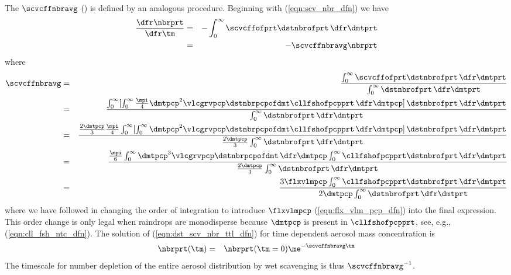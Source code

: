 \documentclass[12pt,twoside]{book}
\begin{document}
The  $\scvcffnbravg$
(\xs) is defined by an analogous procedure.
Beginning with (\ref{eqn:scv_nbr_dfn}) we have
\begin{eqnarray}
\frac{\dfr\nbrprt}{\dfr\tm}
& = & - \int_{0}^{\infty} \scvcffofprt \dstnbrofprt \,\dfr\dmtprt \nonumber \\
& = & - \scvcffnbravg \nbrprt
\label{eqn:dst_scv_nbr_ttl_dfn}
\end{eqnarray}
where
\begin{eqnarray}
\label{eqn:scv_cff_nbr_avg_dfn}
\scvcffnbravg & = & \frac{
\int_{0}^{\infty} \scvcffofprt \dstnbrofprt \,\dfr\dmtprt 
}{
\int_{0}^{\infty} \dstnbrofprt \,\dfr\dmtprt } \\
& = & \frac{
\int_{0}^{\infty} 
[ \int_{0}^{\infty} \frac{\mpi}{4} \dmtpcp^{2} \vlcgrvpcp \dstnbrpcpofdmt 
\cllfshofpcpprt \,\dfr\dmtpcp ] \, \dstnbrofprt \,\dfr\dmtprt 
}{
\int_{0}^{\infty} \dstnbrofprt \,\dfr\dmtprt } \nonumber \\
& = & \frac{
\frac{2 \dmtpcp}{3} \frac{\mpi}{4} \int_{0}^{\infty} 
[ \int_{0}^{\infty} \dmtpcp^{2} \vlcgrvpcp \dstnbrpcpofdmt 
\cllfshofpcpprt \,\dfr\dmtpcp ] \, \dstnbrofprt \,\dfr\dmtprt 
}{
\frac{2 \dmtpcp}{3} 
\int_{0}^{\infty} \dstnbrofprt \,\dfr\dmtprt } \nonumber \\
& = & \frac{
\frac{\mpi}{6} \int_{0}^{\infty} \dmtpcp^{3} \vlcgrvpcp \dstnbrpcpofdmt \,\dfr\dmtpcp
\int_{0}^{\infty} \cllfshofpcpprt \dstnbrofprt \,\dfr\dmtprt 
}{
\frac{2 \dmtpcp}{3} 
\int_{0}^{\infty} \dstnbrofprt \,\dfr\dmtprt } \nonumber \\
\label{eqn:scv_cff_nbr_avg_dfn_ilg}
& = & \frac{
3 \flxvlmpcp \int_{0}^{\infty} \cllfshofpcpprt \dstnbrofprt \,\dfr\dmtprt 
}{
2 \dmtpcp \int_{0}^{\infty} \dstnbrofprt \,\dfr\dmtprt }
\end{eqnarray}
where we have followed \cite{SeP97} in changing the order of
integration to introduce $\flxvlmpcp$ (\ref{eqn:flx_vlm_pcp_dfn}) into 
the final expression.   
This order change is only legal when raindrops are monodisperse
because $\dmtpcp$ is present in $\cllfshofpcpprt$, see, e.g.,
(\ref{eqn:cll_fsh_ntc_dfn}).  
The solution of (\ref{eqn:dst_scv_nbr_ttl_dfn}) for time dependent
aerosol mass concentration is
\begin{eqnarray}
\nbrprt ( \tm ) & = & \nbrprt(\tm = 0) \me^{- \scvcffnbravg \tm}
\label{eqn:nbr_ttl_sln}
\end{eqnarray}
The timescale for number depletion of the entire aerosol distribution
by wet scavenging is thus $\scvcffnbravg^{-1}$. 
\end{document}
